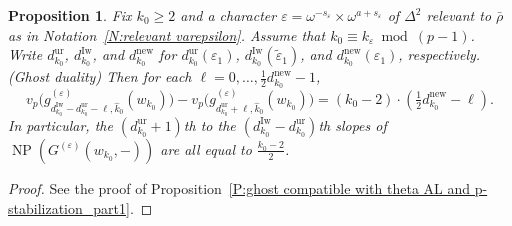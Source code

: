 \documentclass[12pt]{amsart}
\newtheorem{proposition}[subsection]{Proposition}
\theoremstyle{definition}
\numberwithin{equation}{subsection}
\DeclareMathOperator{\NP}{NP}
\newcommand{\new}{\mathrm{new}}
\newcommand{\Iw}{\mathrm{Iw}}
\newcommand{\unr}{\mathrm{ur}}
\begin{document}
\begin{proposition}
\label{P:ghost compatible with theta AL and p-stabilization_part4}
Fix $k_0 \geq 2$ and a character $\varepsilon= \omega^{-s_\varepsilon} \times \omega^{a+s_\varepsilon}$ of $\Delta^2$ relevant to $\bar \rho$ as in Notation~\ref{N:relevant varepsilon}. Assume that ${k_0} \equiv k_\varepsilon \bmod{(p-1)}$. Write $d_{k_0}^\unr$, $d_{k_0}^\Iw$, and $d_{k_0}^{\new}$ for $d_{k_0}^\unr(\varepsilon_1)$, $d_{k_0}^\Iw(\tilde \varepsilon_1)$, and $d_{k_0}^{\new}(\varepsilon_1)$, respectively.
(Ghost duality)
Then for each $\ell = 0, \dots,\frac 12 d_{k_0}^{\new}-1$,
\begin{equation}
\label{E:ghost duality}
v_p\big(g_{d_{k_0}^\Iw - d_{k_0}^\unr -\ell, \hat k_0}^{(\varepsilon)} (w_{k_0}) \big) - v_p\big(g_{ d_{k_0}^\unr +\ell, \hat k_0}^{(\varepsilon)} (w_{k_0}) \big) = ({k_0}-2) \cdot (\tfrac 12d_{k_0}^{\new} - \ell).
\end{equation}
In particular, the $(d_{k_0}^\unr+1)$th to the $(d_{k_0}^\Iw-d_{k_0}^\unr)$th slopes of $\NP(G^{(\varepsilon)}(w_{k_0},-))$ are all equal to $\frac{{k_0}-2}2$.
\end{proposition}
\begin{proof}
See the proof of Proposition~\ref{P:ghost compatible with theta AL and p-stabilization_part1}.
\end{proof}
\end{document}
